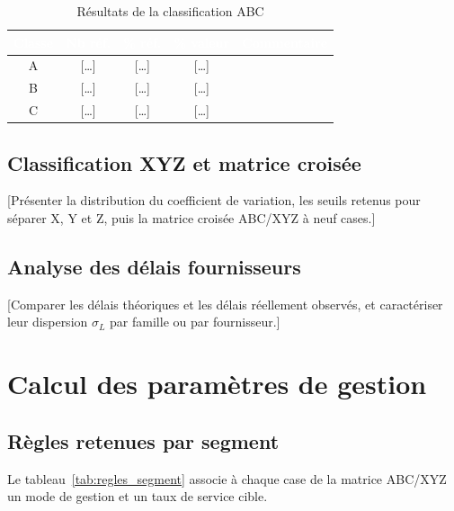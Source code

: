 \begin{table}[H]
  \centering
  \caption{Résultats de la classification ABC}
  \label{tab:resultats_abc}
  \renewcommand{\arraystretch}{1.4}
  \begin{tabularx}{\textwidth}{|c|c|c|c|X|}
    \hline
    \rowcolor{iacsTableHead}
    \textcolor{white}{\textbf{Classe}} &
    \textcolor{white}{\textbf{Nb réf.}} &
    \textcolor{white}{\textbf{\% réf.}} &
    \textcolor{white}{\textbf{\% valeur}} &
    \textcolor{white}{\textbf{Commentaire}} \\
    \hline
    A & [\ldots] & [\ldots] & [\ldots] & \\
    \hline
    \rowcolor{iacsLightGray}
    B & [\ldots] & [\ldots] & [\ldots] & \\
    \hline
    C & [\ldots] & [\ldots] & [\ldots] & \\
    \hline
  \end{tabularx}
\end{table}

\subsection{Classification XYZ et matrice croisée}

\hspace{1cm}[Présenter la distribution du coefficient de variation, les seuils
retenus pour séparer X, Y et Z, puis la matrice croisée ABC/XYZ à neuf cases.]

\subsection{Analyse des délais fournisseurs}

\hspace{1cm}[Comparer les délais théoriques et les délais réellement observés,
et caractériser leur dispersion $\sigma_{L}$ par famille ou par fournisseur.]

\section{Calcul des paramètres de gestion}
\label{sec:calcul_parametres}

\subsection{Règles retenues par segment}

Le tableau~\ref{tab:regles_segment} associe à chaque case de la matrice
ABC/XYZ un mode de gestion et un taux de service cible.

